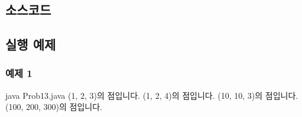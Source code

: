 \documentclass{article}
\theoremstyle{nonumberplain}
\begin{document}
\subsection{소스코드}
\subsection{실행 예제}
\subsubsection{예제 1}
\begin{console}
java Prob13.java
(1, 2, 3)의 점입니다.
(1, 2, 4)의 점입니다.
(10, 10, 3)의 점입니다.
(100, 200, 300)의 점입니다.
\end{console}
\end{document}
